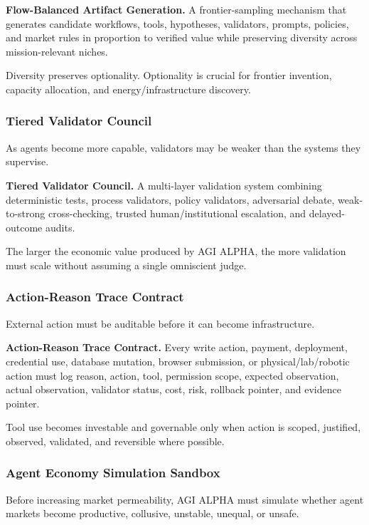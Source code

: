 \textbf{Flow-Balanced Artifact Generation.} A frontier-sampling
mechanism that generates candidate workflows, tools, hypotheses,
validators, prompts, policies, and market rules in proportion to
verified value while preserving diversity across mission-relevant
niches.

Diversity preserves optionality. Optionality is crucial for frontier
invention, capacity allocation, and energy/infrastructure discovery.

\subsubsection{Tiered Validator Council}\label{tiered-validator-council}

As agents become more capable, validators may be weaker than the systems
they supervise.

\textbf{Tiered Validator Council.} A multi-layer validation system
combining deterministic tests, process validators, policy validators,
adversarial debate, weak-to-strong cross-checking, trusted
human/institutional escalation, and delayed-outcome audits.

The larger the economic value produced by AGI ALPHA, the more validation
must scale without assuming a single omniscient judge.

\subsubsection{Action-Reason Trace
Contract}\label{action-reason-trace-contract}

External action must be auditable before it can become infrastructure.

\textbf{Action-Reason Trace Contract.} Every write action, payment,
deployment, credential use, database mutation, browser submission, or
physical/lab/robotic action must log reason, action, tool, permission
scope, expected observation, actual observation, validator status, cost,
risk, rollback pointer, and evidence pointer.

Tool use becomes investable and governable only when action is scoped,
justified, observed, validated, and reversible where possible.

\subsubsection{Agent Economy Simulation
Sandbox}\label{agent-economy-simulation-sandbox}

Before increasing market permeability, AGI ALPHA must simulate whether
agent markets become productive, collusive, unstable, unequal, or
unsafe.


